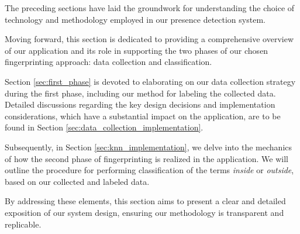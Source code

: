 The preceding sections have laid the groundwork for understanding the choice of technology and methodology employed in our presence detection system.

Moving forward, this section is dedicated to providing a comprehensive overview of our application and its role in supporting the two phases of our chosen fingerprinting approach: data collection and classification. 

Section \ref{sec:first_phase} is devoted to elaborating on our data collection strategy during the first phase, including our method for labeling the collected data. 
Detailed discussions regarding the key design decisions and implementation considerations, which have a substantial impact on the application, are to be found in Section \ref{sec:data_collection_implementation}.

Subsequently, in Section \ref{sec:knn_implementation}, we delve into the mechanics of how the second phase of fingerprinting is realized in the application. We will outline the procedure for performing classification of the terms \textit{inside} or \textit{outside}, based on our collected and labeled data. 

By addressing these elements, this section aims to present a clear and detailed exposition of our system design, ensuring our methodology is transparent and replicable.
